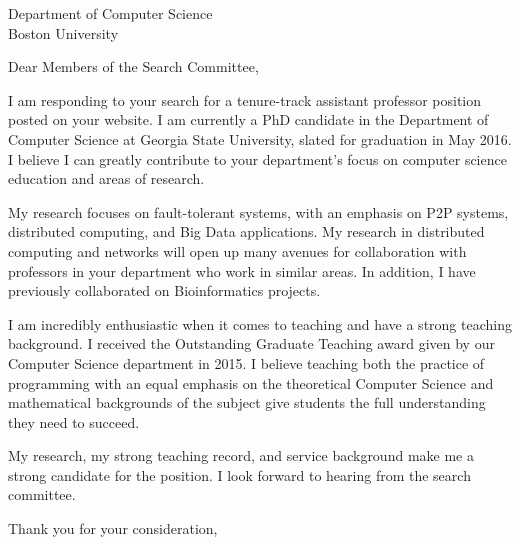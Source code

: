 \documentclass[12pt]{letter}
\date{}
\begin{document}
 
\begin{letter}{Department of Computer Science\\Boston University } 
\opening{Dear Members of the Search Committee,} 
 
I am responding to your search for a tenure-track assistant professor position posted on your website.
I am currently a PhD candidate in the Department of Computer Science at Georgia State University, slated for graduation in May 2016.
I believe I can greatly contribute to your department's focus on computer science education and areas of research.

My research focuses on fault-tolerant systems, with an emphasis on P2P systems, distributed computing, and Big Data applications.
My research in distributed computing and networks will open up many avenues for collaboration with professors in your department who work in similar areas.
In addition, I have previously collaborated on Bioinformatics projects.



I am incredibly enthusiastic when it comes to teaching and have a strong teaching background.
I received the Outstanding Graduate Teaching award given by our Computer Science department in 2015.
I believe teaching both the practice of programming with an equal emphasis on the theoretical Computer Science and mathematical backgrounds of the subject give students the full understanding they need to succeed.




My research, my strong teaching record, and service background make me a strong candidate for the position.
I look forward to hearing from the search committee.


\closing{Thank you for your consideration,} 
\end{letter} 
\end{document}
